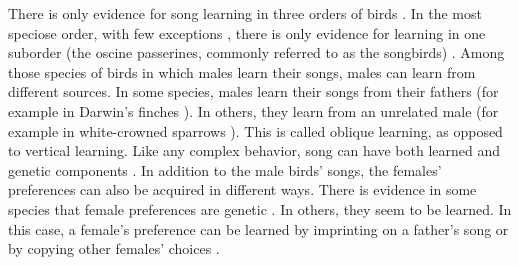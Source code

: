 \documentclass[12pt]{article}
\begin{document}
There is only evidence for song learning in three orders of birds \cite{Beecher:2005ly}. In the most speciose order, with few exceptions \cite{Saranathan:2007dq}, there is only evidence for learning in one suborder (the oscine passerines, commonly referred to as the songbirds) \cite{Seddon:2008bh}.  Among those species of birds in which males learn their songs, males can learn from different sources. In some species, males learn their songs from their fathers (for example in Darwin's finches \cite{Grant:1996ve}). In others, they learn from an unrelated male (for example in white-crowned sparrows \cite{Baptista:1998qf}). This is called oblique learning, as opposed to vertical learning. Like any complex behavior, song can have both learned and genetic components \cite{Forstmeier:2009cr,Slabbekoorn:2002kl,Airey:2000dq}.
In addition to the male birds' songs, the females' preferences can also be acquired in different ways. There is evidence in some species that female preferences are genetic \cite{Verzijden:2005vn}. In others, they seem to be learned. In this case, a female's preference can be learned by imprinting on a father's song \cite{Verzijden:2005vn} or by copying other females' choices \cite{Kirkpatrick:1994vn}. 
\end{document}
